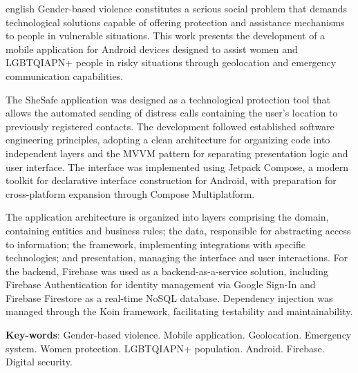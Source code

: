 \documentclass[
	12pt,				    %
	openright,			    %
	oneside,			    %
	a4paper,			    %
    sumario=tradicional,    %
	english,			    %
	brazil,				    %
	]{abntex2}              %
\begin{document}
\begin{resumo}[Abstract]
 \begin{otherlanguage*}{english}
   \noindent
Gender-based violence constitutes a serious social problem that demands technological solutions capable of offering protection and assistance mechanisms to people in vulnerable situations. This work presents the development of a mobile application for Android devices designed to assist women and LGBTQIAPN+ people in risky situations through geolocation and emergency communication capabilities.

The SheSafe application was designed as a technological protection tool that allows the automated sending of distress calls containing the user's location to previously registered contacts. The development followed established software engineering principles, adopting a clean architecture for organizing code into independent layers and the MVVM pattern for separating presentation logic and user interface. The interface was implemented using Jetpack Compose, a modern toolkit for declarative interface construction for Android, with preparation for cross-platform expansion through Compose Multiplatform.

The application architecture is organized into layers comprising the domain, containing entities and business rules; the data, responsible for abstracting access to information; the framework, implementing integrations with specific technologies; and presentation, managing the interface and user interactions. For the backend, Firebase was used as a backend-as-a-service solution, including Firebase Authentication for identity management via Google Sign-In and Firebase Firestore as a real-time NoSQL database. Dependency injection was managed through the Koin framework, facilitating testability and maintainability.

   \vspace{\onelineskip}

   \noindent
   \textbf{Key-words}: Gender-based violence. Mobile application. Geolocation. Emergency system. Women protection. LGBTQIAPN+ population. Android. Firebase. Digital security.
 \end{otherlanguage*}
\end{resumo}

\listoffigures*
\cleardoublepage

 \listoftables*
 \cleardoublepage
\end{document}
